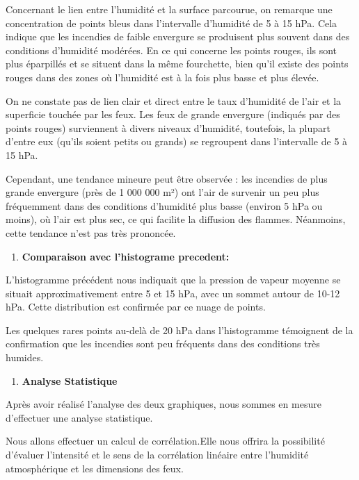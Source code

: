 \documentclass[
]{article}
\providecommand{\tightlist}{%
  \setlength{\itemsep}{0pt}\setlength{\parskip}{0pt}}
\begin{document}
Concernant le lien entre l'humidité et la surface parcourue, on remarque
une concentration de points bleus dans l'intervalle d'humidité de 5 à 15
hPa. Cela indique que les incendies de faible envergure se produisent
plus souvent dans des conditions d'humidité modérées. En ce qui concerne
les points rouges, ils sont plus éparpillés et se situent dans la même
fourchette, bien qu'il existe des points rouges dans des zones où
l'humidité est à la fois plus basse et plus élevée.

On ne constate pas de lien clair et direct entre le taux d'humidité de
l'air et la superficie touchée par les feux. Les feux de grande
envergure (indiqués par des points rouges) surviennent à divers niveaux
d'humidité, toutefois, la plupart d'entre eux (qu'ils soient petits ou
grands) se regroupent dans l'intervalle de 5 à 15 hPa.

Cependant, une tendance mineure peut être observée : les incendies de
plus grande envergure (près de 1 000 000 m²) ont l'air de survenir un
peu plus fréquemment dans des conditions d'humidité plus basse (environ
5 hPa ou moins), où l'air est plus sec, ce qui facilite la diffusion des
flammes. Néanmoins, cette tendance n'est pas très prononcée.

\begin{enumerate}
\def\labelenumi{\arabic{enumi}.}
\setcounter{enumi}{2}
\tightlist
\item
  \textbf{Comparaison avec l'histograme precedent:}
\end{enumerate}

L'histogramme précédent nous indiquait que la pression de vapeur moyenne
se situait approximativement entre 5 et 15 hPa, avec un sommet autour de
10-12 hPa. Cette distribution est confirmée par ce nuage de points.

Les quelques rares points au-delà de 20 hPa dans l'histogramme
témoignent de la confirmation que les incendies sont peu fréquents dans
des conditions très humides.

\begin{enumerate}
\def\labelenumi{\arabic{enumi}.}
\setcounter{enumi}{3}
\tightlist
\item
  \textbf{Analyse Statistique}
\end{enumerate}

Après avoir réalisé l'analyse des deux graphiques, nous sommes en mesure
d'effectuer une analyse statistique.

Nous allons effectuer un calcul de corrélation.Elle nous offrira la
possibilité d'évaluer l'intensité et le sens de la corrélation linéaire
entre l'humidité atmosphérique et les dimensions des feux.
\end{document}
